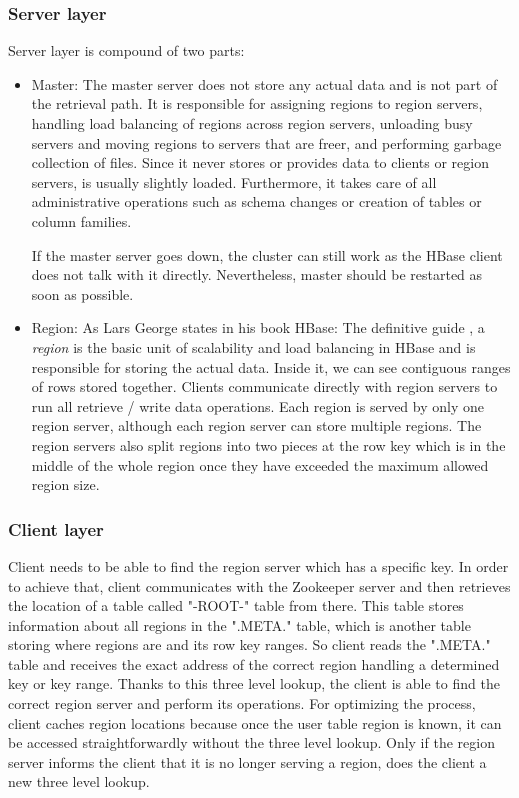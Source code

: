 \subsubsection{Server layer}
Server layer is compound of two parts:
\begin{itemize}
\item Master: The master server does not store any actual data and is not part of the retrieval path. It is responsible for assigning regions to region servers, handling load balancing of regions across region servers, unloading busy servers and moving regions to servers that are freer, and performing garbage collection of files. Since it never stores or provides data to clients or region servers, is usually slightly loaded. Furthermore, it takes care of all administrative operations such as schema changes or creation of tables or column families.
\par
If the master server goes down, the cluster can still work as the HBase client does not talk with it directly. Nevertheless, master should be restarted as soon as possible.
\item Region: As Lars George states in his book HBase: The definitive guide \cite{george2011hbase}, a \textit{region} is the basic unit of scalability and load balancing in HBase and is responsible for storing the actual data. Inside it, we can see contiguous ranges of rows stored together. Clients communicate directly with region servers to run all retrieve / write data operations. Each region is served by only one region server, although each region server can store multiple regions. The region servers also split regions into two pieces at the row key which is in the middle of the whole region once they have exceeded the maximum allowed region size.
\end{itemize}

\subsubsection{Client layer}

Client needs to be able to find the region server which has a specific key. In order to achieve that, client communicates with the Zookeeper server and then retrieves the location of a table called "-ROOT-" table from there. This table stores information about all regions in the ".META." table, which is another table storing where regions are and its row key ranges. So client reads the ".META." table and receives the exact address of the correct region handling a determined key or key range. Thanks to this three level lookup, the client is able to find the correct region server and perform its operations. For optimizing the process, client caches region locations because once the user table region is known, it can be accessed straightforwardly without the three level lookup. Only if the region server informs the client that it is no longer serving a region, does the client a new three level lookup.


